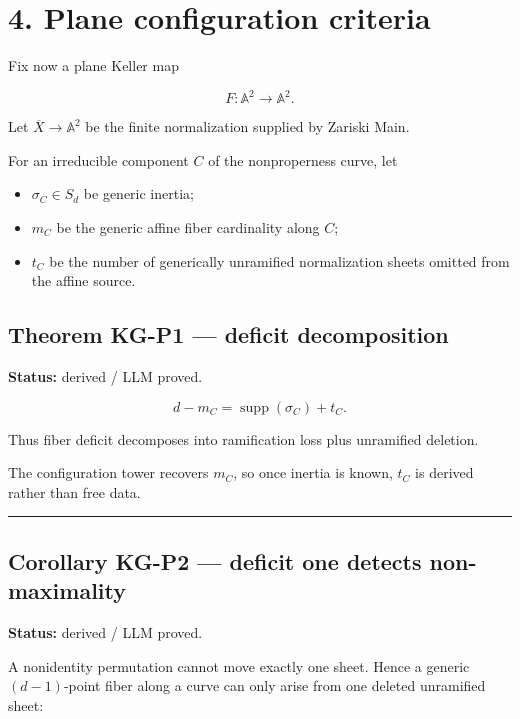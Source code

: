 \section{4. Plane configuration
criteria}\label{plane-configuration-criteria}

Fix now a plane Keller map

\[
F:\mathbb A^2\to\mathbb A^2.
\]

Let \(\overline X\to\mathbb A^2\) be the finite normalization supplied
by Zariski Main.

For an irreducible component \(C\) of the nonproperness curve, let

\begin{itemize}
\tightlist
\item
  \(\sigma_C\in S_d\) be generic inertia;
\item
  \(m_C\) be the generic affine fiber cardinality along \(C\);
\item
  \(t_C\) be the number of generically unramified normalization sheets
  omitted from the affine source.
\end{itemize}

\subsection{Theorem KG-P1 --- deficit
decomposition}\label{theorem-kg-p1-deficit-decomposition}

\textbf{Status:} derived / LLM proved.

\[
\boxed{
d-m_C
=
\operatorname{supp}(\sigma_C)+t_C.
}
\]

Thus fiber deficit decomposes into ramification loss plus unramified
deletion.

The configuration tower recovers \(m_C\), so once inertia is known,
\(t_C\) is derived rather than free data.

\begin{center}\rule{0.5\linewidth}{0.5pt}\end{center}

\subsection{Corollary KG-P2 --- deficit one detects
non-maximality}\label{corollary-kg-p2-deficit-one-detects-non-maximality}

\textbf{Status:} derived / LLM proved.

A nonidentity permutation cannot move exactly one sheet. Hence a generic
\((d-1)\)-point fiber along a curve can only arise from one deleted
unramified sheet:

